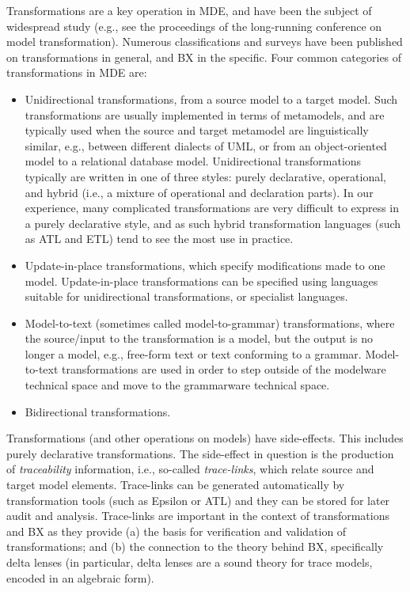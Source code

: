 Transformations are a key operation in MDE, and have been the subject of widespread study (e.g., see the proceedings of the long-running conference on model transformation). Numerous classifications and surveys have been published on transformations in general, and BX in the specific. Four common categories of transformations in MDE are:
\begin{itemize}
\item Unidirectional transformations, from a source model to a target model. Such transformations are usually implemented in terms of metamodels, and are typically used when the source and target metamodel are linguistically similar, e.g., between different dialects of UML, or from an object-oriented model to a relational database model. Unidirectional transformations typically are written in one of three styles: purely declarative, operational, and hybrid (i.e., a mixture of operational and declaration parts). In our experience, many complicated transformations are very difficult to express in a purely declarative style, and as such hybrid transformation languages (such as ATL and ETL) tend to see the most use in practice.

\item Update-in-place transformations, which specify modifications made to one model. Update-in-place transformations can be specified using languages suitable for unidirectional transformations, or specialist languages.

\item Model-to-text (sometimes called model-to-grammar) transformations, where the source/input to the transformation is a model, but the output is no longer a model, e.g., free-form text or text conforming to a grammar. Model-to-text transformations are used in order to step outside of the modelware technical space and move to the grammarware technical space.

\item Bidirectional transformations.
\end{itemize}
Transformations (and other operations on models) have side-effects. This includes purely declarative transformations. The side-effect in question is the production of \textit{traceability} information, i.e., so-called \textit{trace-links}, which relate source and target model elements. Trace-links can be generated automatically by transformation tools (such as Epsilon or ATL) and they can be stored for later audit and analysis. Trace-links are important in the context of transformations and BX as they provide (a) the basis for verification and validation of transformations; and (b) the connection to the theory behind BX, specifically delta lenses (in particular, delta lenses are a sound theory for trace models, encoded in an algebraic form).

